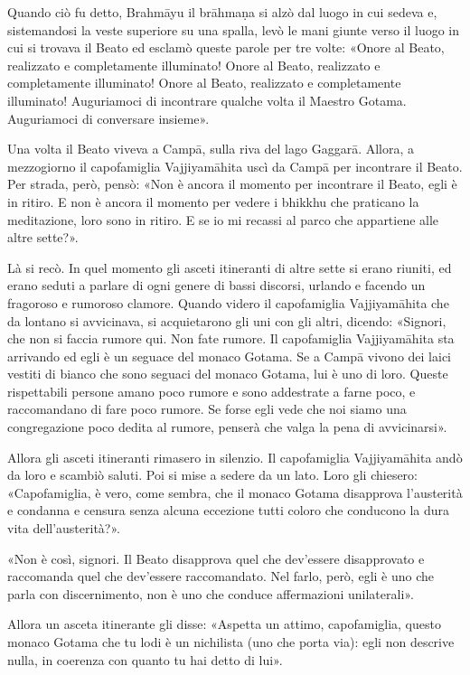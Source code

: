 Quando ciò fu detto, Brahmāyu il brāhmaṇa si alzò dal luogo in cui
sedeva e, sistemandosi la veste superiore su una spalla, levò le mani
giunte verso il luogo in cui si trovava il Beato ed esclamò queste
parole per tre volte: «Onore al Beato, realizzato e completamente
illuminato! Onore al Beato, realizzato e completamente illuminato! Onore
al Beato, realizzato e completamente illuminato! Auguriamoci di
incontrare qualche volta il Maestro Gotama. Auguriamoci di conversare
insieme».




Una volta il Beato viveva a Campā, sulla riva del lago Gaggarā. Allora,
a mezzogiorno il capofamiglia Vajjiyamāhita uscì da Campā per incontrare
il Beato. Per strada, però, pensò: «Non è ancora il momento per
incontrare il Beato, egli è in ritiro. E non è ancora il momento per
vedere i bhikkhu che praticano la meditazione, loro sono in ritiro. E se
io mi recassi al parco che appartiene alle altre sette?».


Là si recò. In quel momento gli asceti itineranti di altre sette si
erano riuniti, ed erano seduti a parlare di ogni genere di bassi
discorsi, urlando e facendo un fragoroso e rumoroso clamore. Quando
videro il capofamiglia Vajjiyamāhita che da lontano si avvicinava, si
acquietarono gli uni con gli altri, dicendo: «Signori, che non si faccia
rumore qui. Non fate rumore. Il capofamiglia Vajjiyamāhita sta arrivando
ed egli è un seguace del monaco Gotama. Se a Campā vivono dei laici
vestiti di bianco che sono seguaci del monaco Gotama, lui è uno di loro.
Queste rispettabili persone amano poco rumore e sono addestrate a farne
poco, e raccomandano di fare poco rumore. Se forse egli vede che noi
siamo una congregazione poco dedita al rumore, penserà che valga la pena
di avvicinarsi».


Allora gli asceti itineranti rimasero in silenzio. Il capofamiglia
Vajjiyamāhita andò da loro e scambiò saluti. Poi si mise a sedere da un
lato. Loro gli chiesero: «Capofamiglia, è vero, come sembra, che il
monaco Gotama disapprova l’austerità e condanna e censura senza alcuna
eccezione tutti coloro che conducono la dura vita dell’austerità?».


«Non è così, signori. Il Beato disapprova quel che dev’essere
disapprovato e raccomanda quel che dev’essere raccomandato. Nel farlo,
però, egli è uno che parla con discernimento, non è uno che conduce
affermazioni unilaterali».


Allora un asceta itinerante gli disse: «Aspetta un attimo, capofamiglia,
questo monaco Gotama che tu lodi è un nichilista (uno che porta via):
egli non descrive nulla, in coerenza con quanto tu hai detto di lui».



